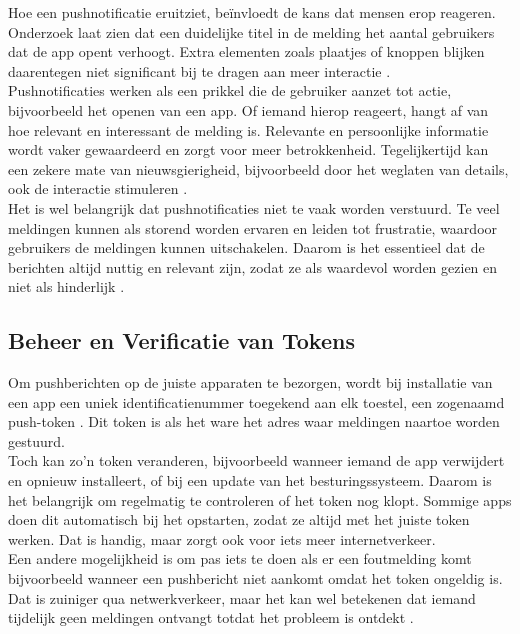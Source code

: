 Hoe een pushnotificatie eruitziet, beïnvloedt de kans dat mensen erop reageren. Onderzoek laat zien dat een duidelijke titel in de melding het aantal gebruikers dat de app opent verhoogt. Extra elementen zoals plaatjes of knoppen blijken daarentegen niet significant bij te dragen aan meer interactie \autocite{Wohllebe2021}.\\

Pushnotificaties werken als een prikkel die de gebruiker aanzet tot actie, bijvoorbeeld het openen van een app. Of iemand hierop reageert, hangt af van hoe relevant en interessant de melding is. Relevante en persoonlijke informatie wordt vaker gewaardeerd en zorgt voor meer betrokkenheid. Tegelijkertijd kan een zekere mate van nieuwsgierigheid, bijvoorbeeld door het weglaten van details, ook de interactie stimuleren \autocite{Wohllebe2021}.\\

Het is wel belangrijk dat pushnotificaties niet te vaak worden verstuurd. Te veel meldingen kunnen als storend worden ervaren en leiden tot frustratie, waardoor gebruikers de meldingen kunnen uitschakelen. Daarom is het essentieel dat de berichten altijd nuttig en relevant zijn, zodat ze als waardevol worden gezien en niet als hinderlijk \autocite{Wohllebe2021}.\\

\subsection{Beheer en Verificatie van Tokens}
Om pushberichten op de juiste apparaten te bezorgen, wordt bij installatie van een app een uniek identificatienummer toegekend aan elk toestel, een zogenaamd push-token \autocite{pushwoosh2025}. Dit token is als het ware het adres waar meldingen naartoe worden gestuurd.\\

Toch kan zo’n token veranderen, bijvoorbeeld wanneer iemand de app verwijdert en opnieuw installeert, of bij een update van het besturingssysteem. Daarom is het belangrijk om regelmatig te controleren of het token nog klopt. Sommige apps doen dit automatisch bij het opstarten, zodat ze altijd met het juiste token werken. Dat is handig, maar zorgt ook voor iets meer internetverkeer.\\

Een andere mogelijkheid is om pas iets te doen als er een foutmelding komt bijvoorbeeld wanneer een pushbericht niet aankomt omdat het token ongeldig is. Dat is zuiniger qua netwerkverkeer, maar het kan wel betekenen dat iemand tijdelijk geen meldingen ontvangt totdat het probleem is ontdekt \autocite{pushwoosh2025}.\\

